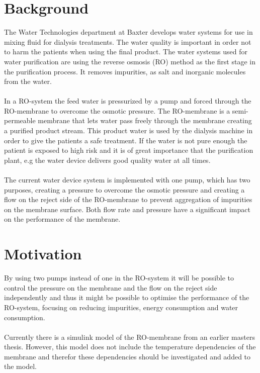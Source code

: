 
\section{Background}

The Water Technologies department at Baxter develops water systems for use in mixing fluid for dialysis treatments. The water quality is important in order not to harm the patients when using the final product. The water systems used for water purification are using the reverse osmosis (RO) method as the first stage in the purification process. It removes impurities, as salt and inorganic molecules from the water\cite{Dow}.\\
\\
In a RO-system the feed water is pressurized by a pump and forced through the RO-membrane to overcome the osmotic pressure. The RO-membrane is a semi-permeable membrane that lets water pass freely through the membrane creating a purified product stream. This product water is used by the dialysis machine in order to give the patients a safe treatment. If the water is not pure enough the patient is exposed to high risk and it is of great importance that the purification plant, e.g the water device delivers good quality water at all times.\\
\\
The current water device system is implemented with one pump, which has two purposes, creating a pressure to overcome the osmotic pressure and creating a flow on the reject side of the RO-membrane to prevent aggregation of impurities on the membrane surface. Both flow rate and pressure have a significant impact on the performance of the membrane.\\


\section{Motivation}
By using two pumps instead of one in the RO-system it will be possible to control the pressure on the membrane and the flow on the reject side independently and thus it might be possible to optimise the performance of the RO-system, focusing on reducing impurities, energy consumption and water consumption. \\
\\
Currently there is a simulink model of the RO-membrane from an earlier masters thesis. However, this model does not include the temperature dependencies of the membrane and therefor these dependencies should be investigated and added to the model. 
